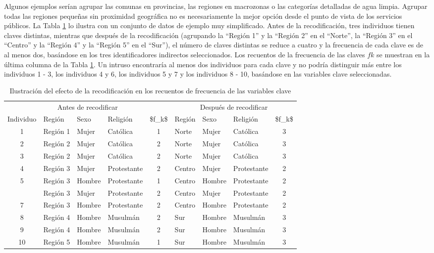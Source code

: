 \documentclass[
]{book}
\theoremstyle{definition}
\theoremstyle{definition}
\theoremstyle{definition}
\theoremstyle{definition}
\theoremstyle{remark}
\begin{document}
Algunos ejemplos serían agrupar las comunas en provincias, las regiones en macrozonas o las categorías detalladas de agua limpia. Agrupar todas las regiones pequeñas sin proximidad geográfica no es necesariamente la mejor opción desde el punto de vista de los servicios públicos. La Tabla \ref{tab:Tabla7} lo ilustra con un conjunto de datos de ejemplo muy simplificado. Antes de la recodificación, tres individuos tienen claves distintas, mientras que después de la recodificación (agrupando la ``Región 1'' y la ``Región 2'' en el ``Norte'', la ``Región 3'' en el ``Centro'' y la ``Región 4'' y la ``Región 5'' en el ``Sur''), el número de claves distintas se reduce a cuatro y la frecuencia de cada clave es de al menos dos, basándose en los tres identificadores indirectos seleccionados. Los recuentos de la frecuencia de las claves \(fk\) se muestran en la última columna de la Tabla \ref{tab:Tabla7}. Un intruso encontraría al menos dos individuos para cada clave y no podría distinguir más entre los individuos 1 - 3, los individuos 4 y 6, los individuos 5 y 7 y los individuos 8 - 10, basándose en las variables clave seleccionadas.

\begin{table}

\caption{\label{tab:Tabla7}\label{tab:Tabla7}Ilustración del efecto de la recodificación en los recuentos de frecuencia de las variables clave}
\centering
\begin{tabular}[t]{clllclllc}
\toprule
\multicolumn{5}{c}{Antes de recodificar} & \multicolumn{4}{c}{Después de recodificar} \\
\cmidrule(l{3pt}r{3pt}){1-5} \cmidrule(l{3pt}r{3pt}){6-9}
Individuo & Región & Sexo & Religión & \$f\_k\$ & Región & Sexo & Religión & \$f\_k\$\\
\midrule
1 & Región 1 & Mujer & Católica & 1 & Norte & Mujer & Católica & 3\\
2 & Región 2 & Mujer & Católica & 2 & Norte & Mujer & Católica & 3\\
3 & Región 2 & Mujer & Católica & 2 & Norte & Mujer & Católica & 3\\
4 & Región 3 & Mujer & Protestante & 2 & Centro & Mujer & Protestante & 2\\
5 & Región 3 & Hombre & Protestante & 1 & Centro & Hombre & Protestante & 2\\
\addlinespace
6 & Región 3 & Mujer & Protestante & 2 & Centro & Mujer & Protestante & 2\\
7 & Región 3 & Hombre & Protestante & 2 & Centro & Hombre & Protestante & 2\\
8 & Región 4 & Hombre & Musulmán & 2 & Sur & Hombre & Musulmán & 3\\
9 & Región 4 & Hombre & Musulmán & 2 & Sur & Hombre & Musulmán & 3\\
10 & Región 5 & Hombre & Musulmán & 1 & Sur & Hombre & Musulmán & 3\\
\bottomrule
\end{tabular}
\end{table}
\end{document}
